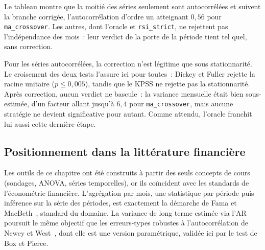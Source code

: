 Le tableau montre que la moitié des séries seulement sont autocorrélées et
suivent la branche corrigée, l'autocorrélation d'ordre un atteignant $0{,}56$
pour \texttt{ma\_crossover}. Les autres, dont l'oracle et \texttt{rsi\_strict},
ne rejettent pas l'indépendance des mois~: leur verdict de la porte de la
période tient tel quel, sans correction.

Pour les séries autocorrélées, la correction n'est légitime que sous
stationnarité. Le croisement des deux tests l'assure ici pour toutes~: Dickey
et Fuller rejette la racine unitaire ($p \le 0{,}005$), tandis que le KPSS ne
rejette pas la stationnarité. Après correction, aucun verdict ne bascule~: la
variance mensuelle était bien sous-estimée, d'un facteur allant jusqu'à
$6{,}4$ pour \texttt{ma\_crossover}, mais aucune stratégie ne devient
significative pour autant. Comme attendu, l'oracle franchit lui aussi cette
dernière étape.



\subsection{Positionnement dans la littérature financière}
\label{sec:b1-positionnement}

Les outils de ce chapitre ont été construits à partir des seuls concepts de
cours (sondages, ANOVA, séries temporelles), or ils coïncident avec les
standards de l'économétrie financière.
L'agrégation par mois, une statistique par période puis inférence
sur la série des périodes, est exactement la démarche de
Fama et MacBeth~\cite{famamacbeth1973}, standard du domaine.
La variance de long terme estimée via l'AR poursuit le même
objectif que les erreurs-types robustes à l'autocorrélation de
Newey et West~\cite{neweywest1987}, dont elle est une version paramétrique,
validée ici par le test de Box et Pierce.

